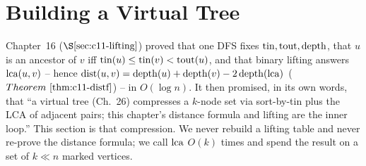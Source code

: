 \section{Building a Virtual Tree}\label{sec:c30-construction}

\begin{previouslybox}
Chapter~16 (\(\secref{c11-lifting}\)) proved that one DFS fixes \(\operatorname{tin},\operatorname{tout},\operatorname{depth}\), that
\(u\) is an ancestor of \(v\) iff \(\operatorname{tin}(u)\le\operatorname{tin}(v)<\operatorname{tout}(u)\), and that binary
lifting answers \(\operatorname{lca}(u,v)\) -- hence \(\operatorname{dist}(u,v)=\operatorname{depth}(u)+\operatorname{depth}(v)-2\operatorname{depth}(\operatorname{lca})\)
(\(\thmref{c11-distf}\)) -- in \(O(\log n)\).  It then promised, in its own words,
that ``a virtual tree (Ch.~26) compresses a \(k\)-node set via sort-by-tin plus the
LCA of adjacent pairs; this chapter's distance formula and lifting are the inner
loop.''  This section is that compression.  We never rebuild a lifting table and
never re-prove the distance formula; we call \(\operatorname{lca}\) \(O(k)\) times and spend the
result on a set of \(k\ll n\) marked vertices.
\end{previouslybox}

